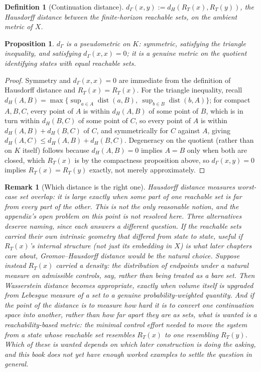 \documentclass[11pt]{report}
\newtheorem{proposition}{Proposition}[chapter]
\newtheorem{definition}{Definition}[chapter]
\newtheorem{remark}{Remark}[chapter]
\begin{document}
\begin{definition}[Continuation distance]
$d_\Gamma(x,y) := d_H(R_T(x), R_T(y))$, the Hausdorff distance between
the finite-horizon reachable sets, on the ambient metric of $X$.
\end{definition}

\begin{proposition}
$d_\Gamma$ is a pseudometric on $K$: symmetric, satisfying the triangle
inequality, and satisfying $d_\Gamma(x,x) = 0$; it is a genuine metric
on the quotient identifying states with equal reachable sets.
\end{proposition}
\begin{proof}
Symmetry and $d_\Gamma(x,x)=0$ are immediate from the definition of
Hausdorff distance and $R_T(x) = R_T(x)$. For the triangle inequality,
recall $d_H(A,B) = \max\{\sup_{a \in A} \operatorname{dist}(a,B),\
\sup_{b \in B} \operatorname{dist}(b,A)\}$; for compact $A,B,C$, every
point of $A$ is within $d_H(A,B)$ of some point of $B$, which is in
turn within $d_H(B,C)$ of some point of $C$, so every point of $A$ is
within $d_H(A,B) + d_H(B,C)$ of $C$, and symmetrically for $C$ against
$A$, giving $d_H(A,C) \leq d_H(A,B) + d_H(B,C)$. Degeneracy on the
quotient (rather than on $K$ itself) follows because $d_H(A,B) = 0$
implies $A = B$ only when both are closed, which $R_T(x)$ is by the
compactness proposition above, so $d_\Gamma(x,y) = 0$ implies
$R_T(x) = R_T(y)$ exactly, not merely approximately.
\end{proof}

\begin{remark}[Which distance is the right one]
Hausdorff distance measures worst-case set overlap: it is large exactly
when some part of one reachable set is far from every part of the
other. This is not the only reasonable notion, and the appendix's open
problem on this point is not resolved here. Three alternatives deserve
naming, since each answers a different question. If the reachable sets
carried their own intrinsic geometry that differed from state to
state, useful if $R_T(x)$'s internal structure (not just its embedding
in $X$) is what later chapters care about, Gromov--Hausdorff distance
would be the natural choice. Suppose instead $R_T(x)$ carried a
density: the distribution of endpoints under a natural measure on
admissible controls, say, rather than being treated as a bare set.
Then Wasserstein distance becomes appropriate, exactly when volume
itself is upgraded from Lebesgue measure of a set to a genuine
probability-weighted quantity. And if the point of the distance is to
measure how hard it is to convert one continuation space into another,
rather than how far apart they are as sets, what is wanted is a
reachability-based metric: the minimal control effort needed to move
the system from a state whose reachable set resembles $R_T(x)$ to one
resembling $R_T(y)$. Which of these is wanted depends on which later
construction is doing the asking, and this book does not yet have
enough worked examples to settle the question in general.
\end{remark}
\end{document}
